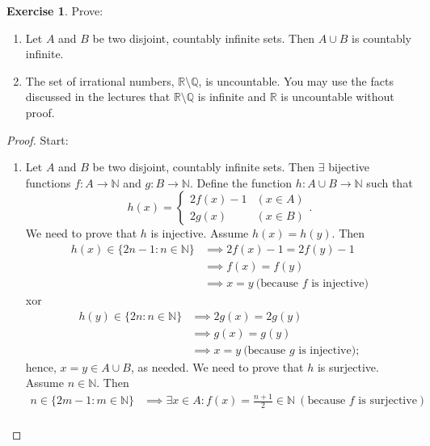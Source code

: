 \documentclass[12pt]{article}
\theoremstyle{definition}
\newtheorem{exercise}{Exercise}
\begin{document}
\begin{exercise}
    Prove: 
    \begin{enumerate}[label=(\alph*)]
        \item Let $A$ and $B$ be two disjoint, countably infinite sets. Then $A \cup B$ is countably infinite.
        \item The set of irrational numbers, $\mathbb{R}\setminus\mathbb{Q}$, is uncountable. You may use the facts discussed in the lectures that $\mathbb{R}\setminus\mathbb{Q}$ is infinite and $\mathbb{R}$ is uncountable without proof.
    \end{enumerate}
\end{exercise}

\begin{proof}
    Start:
    \begin{enumerate}[label=(\alph*)]
        \item Let $A$ and $B$ be two disjoint, countably infinite sets. Then $\exists$ bijective functions $f : A \to \mathbb{N}$ and $g : B \to \mathbb{N}$. Define the function $h : A \cup B \to \mathbb{N}$ such that
        \[
            h(x) = \begin{cases}
                2f(x) - 1 & (x \in A) \\
                2g(x) & (x \in B)
            \end{cases}.
        \]
        We need to prove that $h$ is injective. Assume $h(x) = h(y)$. Then
        \begin{align*}
            h(x) \in \{2n - 1 : n \in \mathbb{N}\} &\implies 2f(x) - 1 = 2f(y) - 1 \\
            &\implies f(x) = f(y) \\
            &\implies x = y \ (\text{because $f$ is injective)}
        \end{align*}
        xor
        \begin{align*}
            h(y) \in \{2n : n \in \mathbb{N}\} &\implies 2g(x) = 2g(y) \\
            &\implies g(x) = g(y) \\
            &\implies x = y \ (\text{because $g$ is injective)};
        \end{align*}
        hence, $x = y \in A \cup B$, as needed. We need to prove that $h$ is surjective. Assume $n \in \mathbb{N}$. Then
        \begin{align*}
            n \in \{2m - 1 : m \in \mathbb{N}\} &\implies \exists x \in A : f(x) = \frac{n + 1}{2} \in \mathbb{N} \ (\text{because $f$ is surjective}) \\

\end{align*}
\end{enumerate}
\end{proof}
\end{document}

